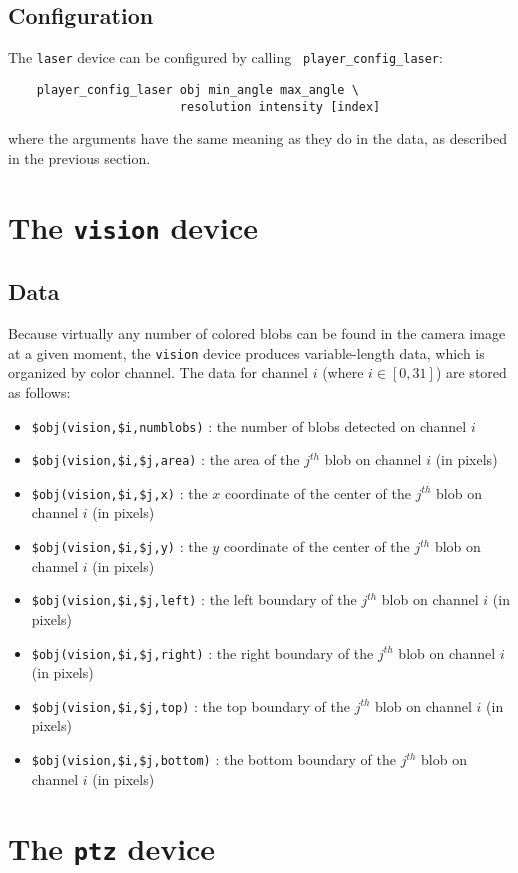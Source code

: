 \documentclass[11pt]{article}
\begin{document}
\subsection{Configuration}
The {\tt laser} device can be configured by calling {\tt
player\_config\_laser}:
\begin{verbatim}
    player_config_laser obj min_angle max_angle \
                        resolution intensity [index]
\end{verbatim}
where the arguments have the same meaning as they do in the data, as described
in the previous section.

\section{The {\tt vision} device}
\subsection{Data}
Because virtually any number of colored blobs can be found in the camera image 
at a given moment, the {\tt vision} device produces variable-length data,
which is organized by color channel.  The data for channel $i$ (where 
$i \in [0,31]$) are stored as follows:
\begin{itemize}
\item {\tt \$obj(vision,\$i,numblobs)} : the number of blobs detected on
channel $i$
\item {\tt \$obj(vision,\$i,\$j,area)} : the area of the $j^{th}$ blob on
channel $i$ (in pixels)
\item {\tt \$obj(vision,\$i,\$j,x)} : the $x$ coordinate of the center of the 
$j^{th}$ blob on channel $i$ (in pixels)
\item {\tt \$obj(vision,\$i,\$j,y)} : the $y$ coordinate of the center of the 
$j^{th}$ blob on channel $i$ (in pixels)
\item {\tt \$obj(vision,\$i,\$j,left)} : the left boundary of the $j^{th}$ 
blob on channel $i$ (in pixels)
\item {\tt \$obj(vision,\$i,\$j,right)} : the right boundary of the $j^{th}$ 
blob on channel $i$ (in pixels)
\item {\tt \$obj(vision,\$i,\$j,top)} : the top boundary of the $j^{th}$ 
blob on channel $i$ (in pixels)
\item {\tt \$obj(vision,\$i,\$j,bottom)} : the bottom boundary of the $j^{th}$ 
blob on channel $i$ (in pixels)
\end{itemize}

\section{The {\tt ptz} device}
\end{document}
